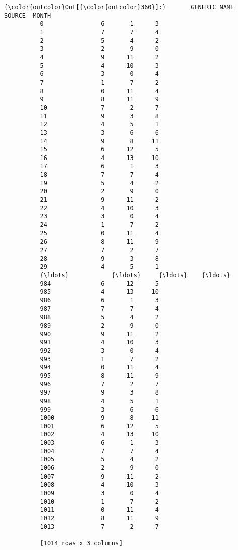 \documentclass[11pt]{article}
\begin{document}
\begin{Verbatim}[commandchars=\\\{\}]
{\color{outcolor}Out[{\color{outcolor}360}]:}       GENERIC NAME  SOURCE  MONTH
          0                6       1      3
          1                7       7      4
          2                5       4      2
          3                2       9      0
          4                9      11      2
          5                4      10      3
          6                3       0      4
          7                1       7      2
          8                0      11      4
          9                8      11      9
          10               7       2      7
          11               9       3      8
          12               4       5      1
          13               3       6      6
          14               9       8     11
          15               6      12      5
          16               4      13     10
          17               6       1      3
          18               7       7      4
          19               5       4      2
          20               2       9      0
          21               9      11      2
          22               4      10      3
          23               3       0      4
          24               1       7      2
          25               0      11      4
          26               8      11      9
          27               7       2      7
          28               9       3      8
          29               4       5      1
          {\ldots}            {\ldots}     {\ldots}    {\ldots}
          984              6      12      5
          985              4      13     10
          986              6       1      3
          987              7       7      4
          988              5       4      2
          989              2       9      0
          990              9      11      2
          991              4      10      3
          992              3       0      4
          993              1       7      2
          994              0      11      4
          995              8      11      9
          996              7       2      7
          997              9       3      8
          998              4       5      1
          999              3       6      6
          1000             9       8     11
          1001             6      12      5
          1002             4      13     10
          1003             6       1      3
          1004             7       7      4
          1005             5       4      2
          1006             2       9      0
          1007             9      11      2
          1008             4      10      3
          1009             3       0      4
          1010             1       7      2
          1011             0      11      4
          1012             8      11      9
          1013             7       2      7
          
          [1014 rows x 3 columns]
\end{Verbatim}
            
\end{document}
